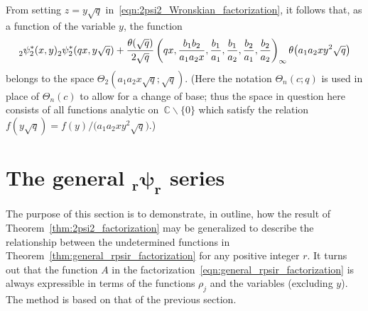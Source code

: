 \documentclass[pdftex]{sigma}
\numberwithin{equation}{section}
\newcommand{\C}{\mathbb{C}}
\begin{document}
\begin{Remark}
From setting $z=y\sqrt{q}$ in~\eqref{eqn:2psi2_Wronskian_factorization}, it follows that, as a function of the variable $y$, the function
\[ {}_2^{}\psi_2^\ast(x,y) {}_2^{}\psi_2^\ast(qx,y\sqrt{q}) + {\theta(\sqrt{q}) \over 2\sqrt{q}} \left(qx,{b_1b_2 \over a_1a_2x},{b_1 \over a_1},{b_1 \over a_2},{b_2 \over a_1},{b_2 \over a_2}\right)_{ \infty} \theta\bigl(a_1a_2xy^2\sqrt{q}\bigr) \]
belongs to the space $\Theta_2(a_1a_2x\sqrt{q};\sqrt{q})$. \big(Here the notation $\Theta_n(c;q)$ is used in place of $\Theta_n(c)$ to allow for a change of base; thus the space in question here consists of all functions analytic on~$\C \backslash \{0\}$ which satisfy the relation $f(y\sqrt{q}) = f(y)/\bigl(a_1a_2xy^2\sqrt{q}\bigr)$.\big)
\end{Remark}

\section[The general \_r psi\_r series]{The general $\boldsymbol{_r\psi_r}$ series}

The purpose of this section is to demonstrate, in outline, how the result of Theorem~\ref{thm:2psi2_factorization} may be generalized to describe the relationship between the undetermined functions in Theorem~\ref{thm:general_rpsir_factorization} for any positive integer $r$. It turns out that the function $A$ in the factorization~\eqref{eqn:general_rpsir_factorization} is always expressible in terms of the functions $\rho_j$ and the variables (excluding $y$). The method is based on that of the previous section.
\end{document}
